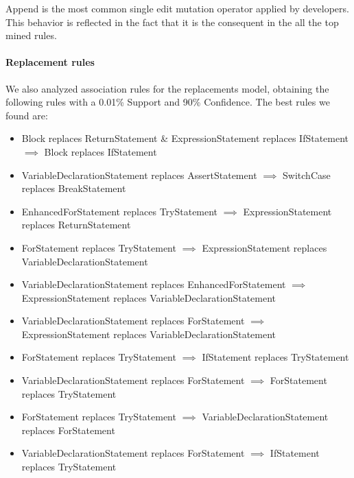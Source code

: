\documentclass[conference]{IEEEtran}
\begin{document}
Append is the most common single edit mutation operator applied by developers. This behavior is
reflected in the fact that it is the consequent in the all the top mined
rules.  

\paragraph {Replacement rules} We also analyzed association rules for the
replacements model, obtaining
the following rules with a 0.01\% Support and 90\% Confidence. %
The best rules we found are: 
\begin{itemize}
\item Block replaces ReturnStatement \& ExpressionStatement replaces IfStatement $\implies$ Block replaces IfStatement
\item VariableDeclarationStatement replaces AssertStatement $\implies$ SwitchCase replaces BreakStatement
\item EnhancedForStatement replaces TryStatement $\implies$ ExpressionStatement replaces ReturnStatement
\item ForStatement replaces TryStatement $\implies$ ExpressionStatement replaces VariableDeclarationStatement
\item VariableDeclarationStatement replaces EnhancedForStatement $\implies$ ExpressionStatement replaces VariableDeclarationStatement
\item VariableDeclarationStatement replaces ForStatement $\implies$ ExpressionStatement replaces VariableDeclarationStatement
\item ForStatement replaces TryStatement $\implies$ IfStatement replaces TryStatement
\item VariableDeclarationStatement replaces ForStatement $\implies$ ForStatement replaces TryStatement
\item ForStatement replaces TryStatement $\implies$ VariableDeclarationStatement replaces ForStatement
\item VariableDeclarationStatement replaces ForStatement $\implies$ IfStatement replaces TryStatement
\end{itemize}

\end{document}
